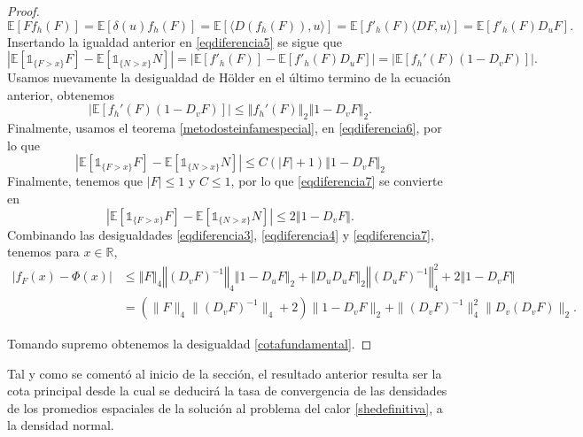 \documentclass[letterpaper,twoside,12pt]{book}
\newcommand{\R}{\mathbb{R}}
\newcommand{\E}{\mathbb{E}}
\newcommand{\1}{\mathds{1}}
\newcommand{\abs}[1]{\left\lvert #1 \right\rvert}
\newcommand{\norm}[1]{\left\Vert #1 \right\Vert}
\theoremstyle{definition}
\theoremstyle{definition}
\theoremstyle{remark}
\theoremstyle{definition}
\theoremstyle{definition}
\theoremstyle{definition}
\theoremstyle{definition}
\theoremstyle{definition}
\begin{document}
\begin{proof}
\begin{equation*}
   \E\left[Ff_h(F)\right]=\E\left[\delta(u)f_h(F)\right]=\E\left[\langle D(f_h(F)),u\rangle\right]=\E\left[f'_h(F)\langle DF,u\rangle\right]=\E\left[f'_h(F)D_uF\right].
\end{equation*}
Insertando la igualdad anterior en \eqref{eqdiferencia5} se sigue que 
   \begin{equation*}
      \abs{\E\left[\1_{\{F>x\}}F\right]-\E\left[\1_{\{N>x\}}N\right]}=\abs{\E\left[f'_h(F)\right]-\E\left[f'_h(F)D_uF\right]}= \abs{\E\left[f_h'(F)(1-D_vF)\right]}.
   \end{equation*}
Usamos nuevamente la desigualdad de Hölder en el último termino de la ecuación anterior, obtenemos
\begin{equation}\label{eqdiferencia6}
   \abs{\E\left[f_h'(F)(1-D_vF)\right]}\leq \norm{f_h'(F)}_2\norm{1-D_vF}_2.
\end{equation}
Finalmente, usamos el teorema \ref{metodosteinfamespecial}, en \ref{eqdiferencia6}, por lo que 
\begin{equation}\label{eqdiferencia7}
      \abs{\E\left[\1_{\{F>x\}}F\right]-\E\left[\1_{\{N>x\}}N\right]}\leq C(\abs{F}+1)\norm{1-D_vF}_2
\end{equation}
Finalmente, tenemos que $|F|\leq 1$ y $C\leq 1$, por lo que \eqref{eqdiferencia7} se convierte en 
\begin{equation}\label{eqdiferencia8}
   \abs{\E\left[\1_{\{F>x\}}F\right]-\E\left[\1_{\{N>x\}}N\right]}\leq2\norm{1-D_vF}.
\end{equation}
Combinando las desigualdades \eqref{eqdiferencia3}, \eqref{eqdiferencia4} y \eqref{eqdiferencia7}, tenemos para $x\in \R$,
\begin{align*}
   \abs{f_F(x)-\Phi(x)}&\leq \norm{F}_4\norm{(D_vF)^{-1}}_4\norm{1-D_uF}_2+\norm{D_uD_uF}_2\norm{(D_uF)^{-1}}_4^{2}+2\norm{1-D_vF}\\
   &=\left(\|F\|_4\|\left(D_vF\right)^{-1}\|_4+2\right)\|1-D_vF\|_2+\|\left(D_vF\right)^{-1}\|_4^{2}\|D_v \left(D_vF\right)\|_2.   
\end{align*}

Tomando supremo obtenemos la desigualdad \eqref{cotafundamental}.
\end{proof}

Tal y como se comentó al inicio de la sección, el resultado anterior resulta ser la cota principal desde la cual se deducirá la tasa de convergencia de las densidades de los promedios espaciales de la solución al problema del calor \eqref{shedefinitiva}, a la densidad normal. 
\end{document}
